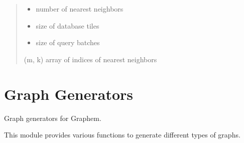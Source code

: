 \documentclass[letterpaper,10pt,english]{sphinxmanual}
\begin{document}
\begin{fulllineitems}
\begin{fulllineitems}
\begin{quote}
\begin{description}
\begin{itemize}
\item {} 
\sphinxAtStartPar
{} \textendash{} number of nearest neighbors

\item {} 
\sphinxAtStartPar
{} \textendash{} size of database tiles

\item {} 
\sphinxAtStartPar
{} \textendash{} size of query batches

\end{itemize}

\sphinxAtStartPar
(m, k) array of indices of nearest neighbors

\end{description}\end{quote}

\end{fulllineitems}


\end{fulllineitems}



\section{Graph Generators}
\label{\detokenize{api_reference:module-graphem.generators}}\label{\detokenize{api_reference:graph-generators}}
\sphinxAtStartPar
Graph generators for Graphem.

\sphinxAtStartPar
This module provides various functions to generate different types of graphs.
\end{document}
